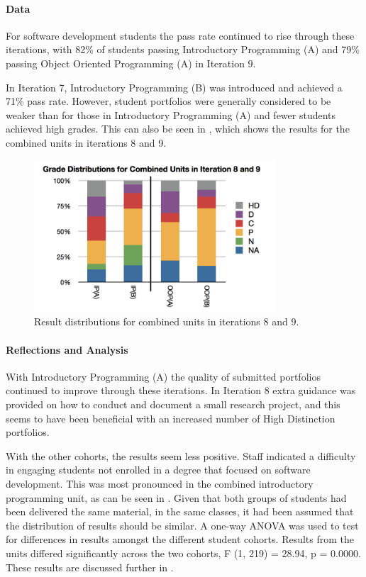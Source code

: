 
\paragraph{Data} %

For software development students the pass rate continued to rise through these iterations, with 82\% of students passing Introductory Programming (A) and 79\% passing Object Oriented Programming (A) in Iteration 9.

In Iteration 7, Introductory Programming (B) was introduced and achieved a 71\% pass rate. However, student portfolios were generally considered to be weaker than for those in Introductory Programming (A) and fewer students achieved high grades. This can also be seen in , which shows the results for the combined units in iterations 8 and 9.

\begin{figure}[htbp]
  \centering
  \includegraphics[width=0.8\textwidth]{CombinedUnits}
  \caption{Result distributions for combined units in iterations 8 and 9.}
  \label{fig:combined}
\end{figure}

\paragraph{Reflections and Analysis} %

With Introductory Programming (A) the quality of submitted portfolios continued to improve through these iterations. In Iteration 8 extra guidance was provided on how to conduct and document a small research project, and this seems to have been beneficial with an increased number of High Distinction portfolios.

With the other cohorts, the results seem less positive. Staff indicated a difficulty in engaging students not enrolled in a degree that focused on software development. This was most pronounced in the combined introductory programming unit, as can be seen in . Given that both groups of students had been delivered the same material, in the same classes, it had been assumed that the distribution of results should be similar. A one-way ANOVA was used to test for differences in results amongst the different student cohorts. Results from the units differed significantly across the two cohorts, F (1, 219) = 28.94, p = 0.0000. These results are discussed further in .


